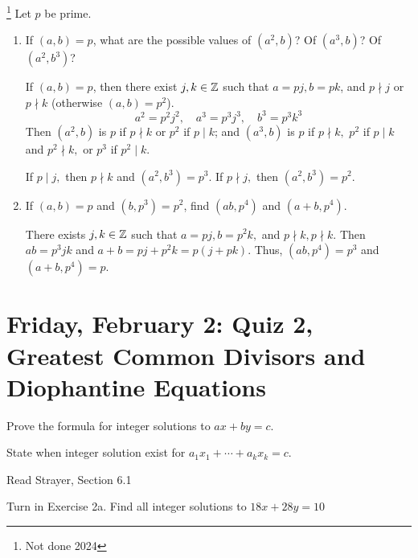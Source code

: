 \documentclass{ximera}
\begin{document}
\begin{br}\footnote{Not done 2024}
	Let $p$ be prime.
	\begin{enumerate}
		\item If $(a,b)=p$, what are the possible values of $(a^2,b)$? Of $(a^3,b)$? Of $(a^2,b^3)$?
		
		\begin{solution}
			If $(a,b)=p$, then there exist $j,k\in\mathbb Z$ such that $a=pj, b=pk$, and $p\nmid j$ or $p\nmid k$ (otherwise $(a,b)=p^2$). 
			\[a^2=p^2j^2,\quad
			a^3=p^3j^3,\quad
			b^3=p^3k^3\]
			Then $(a^2,b)$ is $p$ if $p\nmid k$ or $p^2$ if $p\mid k$; and
			$(a^3,b)$ is $p$ if $p\nmid k,$ $p^2$ if $p\mid k$ and $p^2\nmid k,$ or $p^3$ if $p^2\mid k$. 
			
			If $p\mid j,$ then $p\nmid k$ and   
			$(a^2,b^3)=p^3$.
			If $p\nmid j,$ then   
			$(a^2,b^3)=p^2.$
		\end{solution}
		\item If $(a,b)=p$ and $(b,p^3)=p^2$, find $(ab,p^4)$ and $(a+b,p^4)$.
		
		\begin{solution}
		 	There exists $j,k\in\mathbb Z$ such that $a=pj, b=p^2k,$ and $p\nmid k, p\nmid k$. 
		 	Then $ab=p^3jk$ and $a+b=pj+p^2k=p(j+pk)$. Thus, $(ab,p^4)=p^3$ and $(a+b,p^4)=p.$
		\end{solution}
	\end{enumerate}
\end{br}

\section{Friday, February 2: Quiz 2, Greatest Common Divisors and Diophantine Equations}

\begin{obj}
	\item Prove the formula for integer solutions to $ax+by=c$.
	\item State when integer solution exist for $a_1x_1+\cdots+a_kx_k=c$.
\end{obj}

\begin{pre}
 \item[Read] Strayer, Section 6.1
 \item[Turn in] Exercise 2a.
 Find all integer solutions to $18x+28y=10$

\end{pre}
\end{document}
